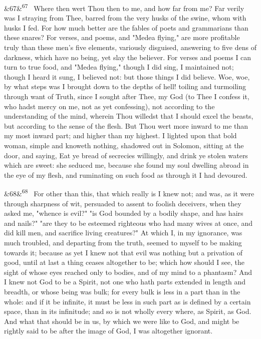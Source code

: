 \documentclass[12pt]{article}
\newcommand{\para}[1][]{\par\noindent\ifx&#1&\else\textsuperscript{\footnotesize #1}~\fi}
\begin{document}
\para[67] Where then wert Thou then to me, and how far from me? Far verily was I straying from Thee, barred from the very husks of the swine, whom with husks I fed. For how much better are the fables of poets and grammarians than these snares? For verses, and poems, and "Medea flying," are more profitable truly than these men's five elements, variously disguised, answering to five dens of darkness, which have no being, yet slay the believer. For verses and poems I can turn to true food, and "Medea flying," though I did sing, I maintained not; though I heard it sung, I believed not: but those things I did believe. Woe, woe, by what steps was I brought down to the depths of hell! toiling and turmoiling through want of Truth, since I sought after Thee, my God (to Thee I confess it, who hadst mercy on me, not as yet confessing), not according to the understanding of the mind, wherein Thou willedst that I should excel the beasts, but according to the sense of the flesh. But Thou wert more inward to me than my most inward part; and higher than my highest. I lighted upon that bold woman, simple and knoweth nothing, shadowed out in Solomon, sitting at the door, and saying, Eat ye bread of secrecies willingly, and drink ye stolen waters which are sweet: she seduced me, because she found my soul dwelling abroad in the eye of my flesh, and ruminating on such food as through it I had devoured.

\para[68] For other than this, that which really is I knew not; and was, as it were through sharpness of wit, persuaded to assent to foolish deceivers, when they asked me, "whence is evil?" "is God bounded by a bodily shape, and has hairs and nails?" "are they to be esteemed righteous who had many wives at once, and did kill men, and sacrifice living creatures?" At which I, in my ignorance, was much troubled, and departing from the truth, seemed to myself to be making towards it; because as yet I knew not that evil was nothing but a privation of good, until at last a thing ceases altogether to be; which how should I see, the sight of whose eyes reached only to bodies, and of my mind to a phantasm? And I knew not God to be a Spirit, not one who hath parts extended in length and breadth, or whose being was bulk; for every bulk is less in a part than in the whole: and if it be infinite, it must be less in such part as is defined by a certain space, than in its infinitude; and so is not wholly every where, as Spirit, as God. And what that should be in us, by which we were like to God, and might be rightly said to be after the image of God, I was altogether ignorant.
\end{document}
